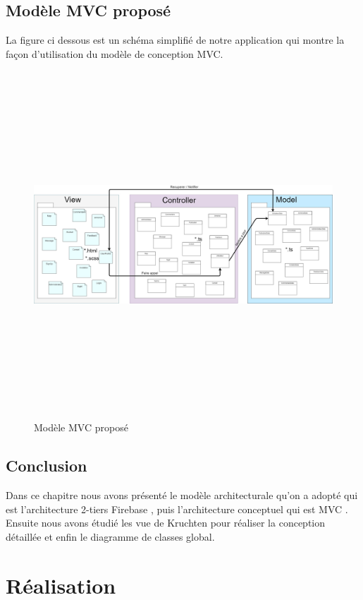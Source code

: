 \documentclass[11pt,a4paper,oneside]{book}
\begin{document}
					\section{Modèle MVC proposé}
					La figure ci dessous est un schéma simplifié de notre application qui montre la façon d’utilisation du modèle de conception MVC.
					\begin{figure}[H]
						\centering
						\includegraphics[width=17.5cm, height=13cm , angle=90]{Images/ch3/mvcClasseGlobal}
						\caption{Modèle MVC proposé }
						\label{fig:mvchanimo}
					\end{figure}
					
					
					\section{Conclusion}
					Dans ce chapitre nous avons présenté le modèle architecturale qu’on a adopté qui est l’architecture 2-tiers Firebase , puis l’architecture conceptuel qui est MVC . Ensuite nous avons étudié les vue de Kruchten pour réaliser la conception détaillée et enfin le diagramme de classes global.
					\chapter{Réalisation}
\end{document}
